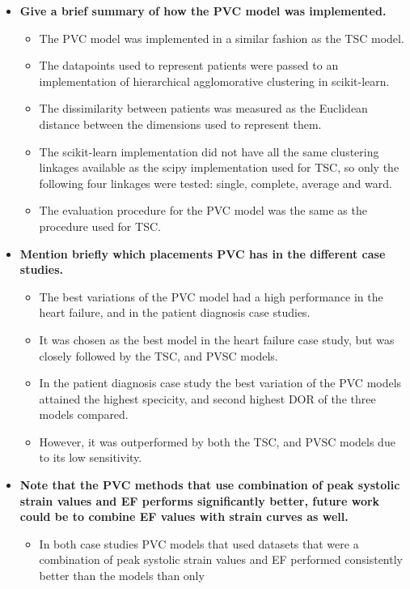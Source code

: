 \begin{itemize}
    \item \textbf{Give a brief summary of how the PVC model was implemented.}
    \begin{itemize}
        \item The PVC model was implemented in a similar fashion as the TSC model.
        \item The datapoints used to represent patients were passed to an implementation of hierarchical agglomorative clustering in scikit-learn.
        \item The dissimilarity between patients was measured as the Euclidean distance between the dimensions used to represent them.
        \item The scikit-learn implementation did not have all the same clustering linkages available as the scipy implementation used for TSC,
              so only the following four linkages were tested: single, complete, average and ward.
        \item The evaluation procedure for the PVC model was the same as the procedure used for TSC.
    \end{itemize}
    \item \textbf{Mention briefly which placements PVC has in the different case studies.}
    \begin{itemize}
        \item The best variations of the PVC model had a high performance in the heart failure, and in the patient diagnosis case studies. 
        \item It was chosen as the best model in the heart failure case study, but was closely followed by the TSC, and PVSC models.
        \item In the patient diagnosis case study the best variation of the PVC models attained the highest specicity, and second highest DOR of the three models compared. 
        \item However, it was outperformed by both the TSC, and PVSC models due to its low sensitivity.
    \end{itemize}
    \item \textbf{Note that the PVC methods that use combination of peak systolic strain values and EF performs significantly better, future work could be to combine EF values with strain curves as well.}
    \begin{itemize}
        \item In both case studies PVC models that used datasets that were a combination of peak systolic strain values and EF performed consistently better than the models than only

\end{itemize}
\end{itemize}
